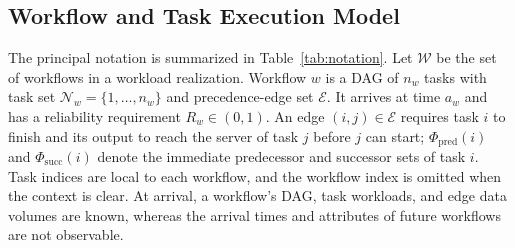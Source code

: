 \documentclass[journal]{IEEEtran}
\begin{document}
\subsection{Workflow and Task Execution Model}
The principal notation is summarized in Table~\ref{tab:notation}. Let $\mathcal W$ be the set of workflows in a workload realization. Workflow $w$ is a DAG of $n_w$ tasks with task set $\mathcal N_w=\{1,\ldots,n_w\}$ and precedence-edge set $\mathcal E$. It arrives at time $a_w$ and has a reliability requirement $R_w\in(0,1)$. An edge $(i,j)\in\mathcal E$ requires task $i$ to finish and its output to reach the server of task $j$ before $j$ can start; $\Phi_{\mathrm{pred}}(i)$ and $\Phi_{\mathrm{succ}}(i)$ denote the immediate predecessor and successor sets of task $i$. Task indices are local to each workflow, and the workflow index is omitted when the context is clear. At arrival, a workflow's DAG, task workloads, and edge data volumes are known, whereas the arrival times and attributes of future workflows are not observable.
\end{document}

